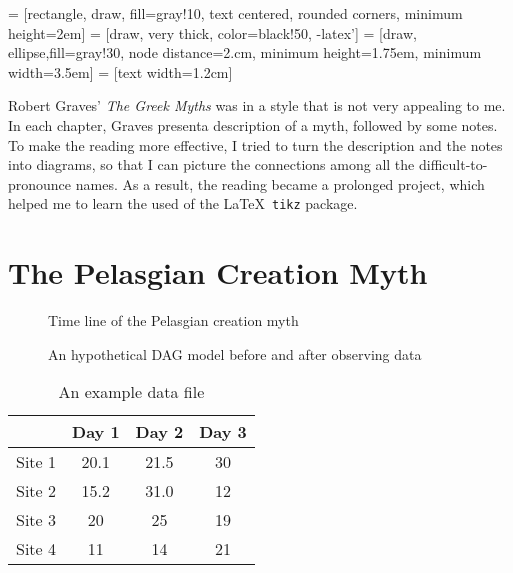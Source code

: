 \documentclass{article}
\begin{document}
\raggedright

 = [rectangle, draw, fill=gray!10,
 text centered, rounded corners, minimum height=2em]
 = [draw, very thick, color=black!50, -latex']
 = [draw, ellipse,fill=gray!30, node distance=2.cm,
    minimum height=1.75em, minimum width=3.5em]
 = [text width=1.2cm]

Robert Graves' \textit{The Greek Myths} was in a style that is not
very appealing to me. In each chapter, Graves presenta description of
a myth, followed by some notes.  To make the reading more effective, I
tried to turn the description and the notes into diagrams, so that I
can picture the connections among all the difficult-to-pronounce
names. As a result, the reading became a prolonged project, which
helped me to learn the used of the \LaTeX\ \texttt{tikz} package.

\section{The Pelasgian Creation Myth} 

\begin{figure}[htb]
\begin{center}
  \resizebox{0.95\textwidth}{!}{

} \end{center}
\caption{Time line of the Pelasgian creation myth}
\label{fig:dagsEX2}
\end{figure}

\begin{figure}[htb]
\begin{center}
\end{center}
\caption{An hypothetical DAG model before and after observing data}
\label{fig:dagsEX}
\end{figure}


\begin{table}[h!]
\centering
\caption{An example data file}
\begin{tabular}{c|ccc} \hline
 & Day 1 & Day 2 & Day 3\\ \hline
Site 1 & 20.1 & 21.5 & 30\\
Site 2 & 15.2 & 31.0& 12\\
Site 3 & 20 & 25 & 19\\
Site 4 & 11 & 14 & 21\\ \hline
\end{tabular}
\label{tab:exdata}
\end{table}
\end{document}
